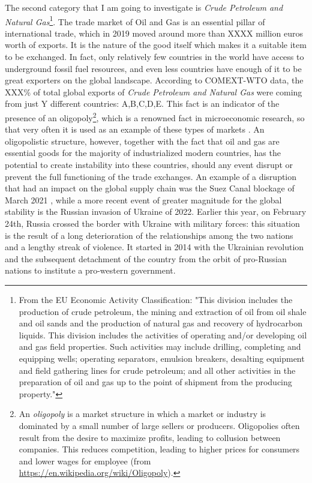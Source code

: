 The second category that I am going to investigate is \textit{Crude Petroleum and Natural Gas}\footnote{
    From the EU Economic Activity Classification:
    "This division includes the production of crude petroleum, the mining and extraction of oil from oil shale and oil sands and the production of natural gas and recovery of hydrocarbon liquids. This division includes the activities of operating and/or developing oil and gas field properties. Such activities may include drilling, completing and equipping wells; operating separators, emulsion breakers, desalting equipment and field gathering lines for crude petroleum; and all other activities in the preparation of oil and gas up to the point of shipment from the producing property."\cite{eurostat2022website}
}. 
The trade market of Oil and Gas is an essential pillar of international trade, which in 2019 moved around more than XXXX million euros worth of exports. It is the nature of the good itself which makes it a suitable item to be exchanged. In fact, only relatively few countries in the world have access to underground fossil fuel resources, and even less countries have enough of it to be great exporters on the global landscape. According to COMEXT-WTO data, the XXX\% of total global exports of \textit{Crude Petroleum and Natural Gas} were coming from just Y different countries: A,B,C,D,E.
This fact is an indicator of the presence of an oligopoly\footnote{
    An \textit{oligopoly} is a market structure in which a market or industry is dominated by a small number of large sellers or producers. Oligopolies often result from the desire to maximize profits, leading to collusion between companies. This reduces competition, leading to higher prices for consumers and lower wages for employee (from \url{https://en.wikipedia.org/wiki/Oligopoly}).
}, which is a renowned fact in microeconomic research, so that very often it is used as an example of these types of markets \cite{mileva2012oil}.
An oligopolistic structure, however, together with the fact that oil and gas are essential goods for the majority of industrialized modern countries, has the potential to create instability into these countries, should any event disrupt or prevent the full functioning of the trade exchanges. An example of a disruption that had an impact on the global supply chain was the Suez Canal blockage of March 2021 \cite{lee2021suez}, while a more recent event of greater magnitude for the global stability is the Russian invasion of Ukraine of 2022. Earlier this year, on February 24th, Russia crossed the border with Ukraine with military forces: this situation is the result of a long deterioration of the relationships among the two nations and a lengthy streak of violence. It started in 2014 with the Ukrainian revolution and the subsequent detachment of the country from the orbit of pro-Russian nations to institute a pro-western government.
